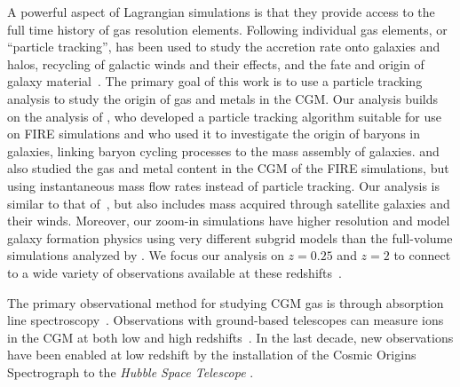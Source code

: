 \documentclass[fleqn,usenatbib]{mnras}
\begin{document}
A powerful aspect of Lagrangian simulations is that they provide access to the full time history of gas resolution elements.
Following individual gas elements, or ``particle tracking'', has been used to study the accretion rate onto galaxies and halos,
recycling of galactic winds and their effects,
and the fate and origin of galaxy material~\citep[e.g.][]{Keres2005,Oppenheimer2010,Ubler2014,Nelson2015,Angles-Alcazar2017,DeFelippis2017,Oppenheimer2017,Crain2017,Brennan2018}.
The primary goal of this work is to use a particle tracking analysis to study the origin of gas and metals in the CGM. 
Our analysis builds on the analysis of \cite{Angles-Alcazar2017}, who developed a particle tracking algorithm suitable for use on FIRE simulations and who used it to investigate the origin of baryons in galaxies, linking baryon cycling processes to the mass assembly of galaxies.
\cite{Muratov2015} and \cite{Muratov2016} also studied the gas and metal content in the CGM of the FIRE simulations, but using instantaneous mass flow rates instead of particle tracking. 
Our analysis is similar to that of~\cite{Ford2014}, but also includes mass acquired through satellite galaxies and their winds.
Moreover, our zoom-in simulations have higher resolution and model galaxy formation physics using very different subgrid models than the full-volume simulations analyzed by \cite{Ford2014}.
We focus our analysis on $z=0.25$ and $z=2$ to connect to a wide variety of observations available at these redshifts~\citep[e.g.][]{Tumlinson2013,Steidel2010, Prochaska2017,Rudie2012,OMeara2013,Lehner2016,Chen2018}.

The primary observational method for studying CGM gas is through absorption line spectroscopy~\citep[e.g.,][]{Bahcall1969a}.
Observations with ground-based telescopes can measure ions in the CGM at both low and high redshifts~\citep[e.g.][]{2006ApJ...637..648S,2010ApJ...724L.176C, Steidel2010,Rudie2012, Kacprzak2012}.
In the last decade, new observations have been enabled at low redshift by the installation of the Cosmic Origins Spectrograph \citep{Green2012} to the \textit{Hubble Space Telescope} \citep[e.g.][]{Tumlinson2013,Werk2014,Liang2014,Johnson2017,Keeney2017}.
\end{document}
